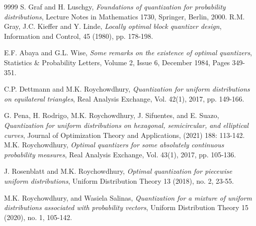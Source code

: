 \documentclass[12pt, reqno]{amsart}
\theoremstyle{plain}
\theoremstyle{definition}
\begin{document}
\begin{thebibliography}{9999}
 S. Graf and H. Luschgy, \emph{Foundations of quantization for probability distributions}, Lecture Notes in Mathematics 1730, Springer, Berlin, 2000.
  R.M. Gray, J.C. Kieffer and Y. Linde, \emph{Locally optimal block quantizer design}, Information and Control, 45 (1980), pp. 178-198.

 E.F. Abaya and G.L. Wise, \emph{Some remarks on the existence of optimal quantizers}, Statistics \& Probability Letters, Volume 2, Issue 6, December 1984, Pages 349-351.

 



 





 
 C.P. Dettmann and M.K. Roychowdhury, \emph{Quantization for uniform distributions on equilateral triangles},  Real Analysis Exchange, Vol. 42(1), 2017, pp. 149-166.


 G. Pena, H. Rodrigo, M.K. Roychowdhury, J. Sifuentes, and E. Suazo, \emph{Quantization for uniform distributions on hexagonal, semicircular, and elliptical curves},  Journal of Optimization Theory and Applications,  (2021) 188: 113-142.
 M.K. Roychowdhury, \emph{Optimal quantizers for some absolutely continuous probability measures}, Real Analysis Exchange, Vol. 43(1), 2017, pp. 105-136.

 J. Rosenblatt and M.K. Roychowdhury, \emph{Optimal quantization for piecewise uniform distributions}, Uniform Distribution Theory 13 (2018), no. 2, 23-55.

 M.K. Roychowdhury, and Wasiela Salinas, \emph{Quantization for a mixture of uniform distributions associated with probability vectors}, Uniform Distribution Theory 15 (2020), no. 1, 105-142.


%



 


\end{thebibliography}
\end{document}
